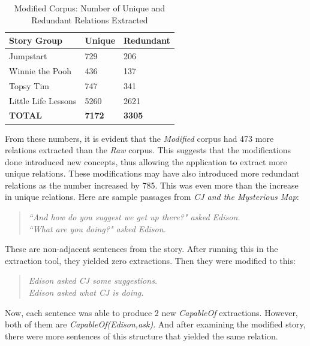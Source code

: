 \begin{table}[H]   %
\centering
\caption{Modified Corpus: Number of Unique and Redundant Relations Extracted} \vspace{0.25em}
\begin{tabular}{|p{4cm}|p{3cm}|p{3cm}|} \hline
\textbf{Story Group} & \textbf{Unique} & \textbf{Redundant} \\ \hline
Jumpstart & 729 & 206 \\ \hline
Winnie the Pooh & 436 & 137 \\ \hline
Topsy Tim & 747 & 341 \\ \hline
Little Life Lessons & 5260 & 2621 \\ \hline
\textbf{TOTAL} & \textbf{7172} & \textbf{3305} \\ \hline
\end{tabular}
\label{tab:modifiedtotal}
\end{table}

From these numbers, it is evident that the \textit{Modified} corpus had 473 more relations extracted than the \textit{Raw} corpus. This suggests that the modifications done introduced new concepts, thus allowing the application to extract more unique relations. These modifications may have also introduced more redundant relations as the number increased by 785. This was even more than the increase in unique relations. Here are sample passages from \textit{CJ and the Mysterious Map}:

\begin{verse}
\itshape
``And how do you suggest we get up there?" asked Edison.\\
``What are you doing?" asked Edison.\\
\end{verse}

These are non-adjacent sentences from the story. After running this in the extraction tool, they yielded zero extractions. Then they were modified to this:

\begin{verse}
\itshape
Edison asked CJ some suggestions.\\
Edison asked what CJ is doing.\\
\end{verse}

Now, each sentence was able to produce 2 new \textit{CapableOf} extractions. However, both of them are \textit{CapableOf(Edison,ask)}. And after examining the modified story, there were more sentences of this structure that yielded the same relation. 

